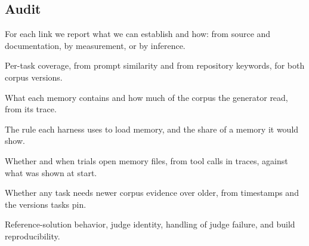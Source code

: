 \subsection{Audit}
For each link we report what we can establish and how: from source and documentation, by measurement, or by inference.
\begin{IEEEdescription}
  \item[Corpus] Per-task coverage, from prompt similarity and from repository keywords, for both corpus versions.
  \item[Generation] What each memory contains and how much of the corpus the generator read, from its trace.
  \item[Harness] The rule each harness uses to load memory, and the share of a memory it would show.
  \item[Agent] Whether and when trials open memory files, from tool calls in traces, against what was shown at start.
  \item[Recency] Whether any task needs newer corpus evidence over older, from timestamps and the versions tasks pin.
  \item[Grader] Reference-solution behavior, judge identity, handling of judge failure, and build reproducibility.
\end{IEEEdescription}
